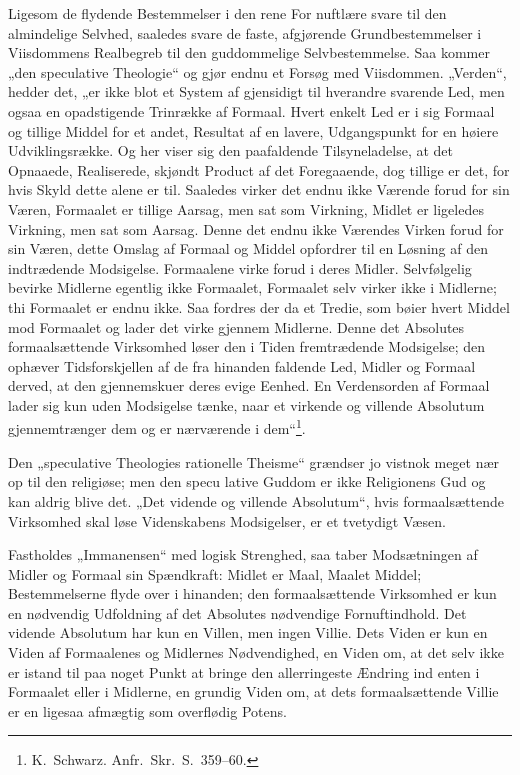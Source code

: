 \documentclass[12pt]{book}
\begin{document}
Ligesom de flydende Bestemmelser i den rene For\-
nuftlære svare til den almindelige Selvhed, saaledes svare de faste,
afgjørende Grundbestemmelser i Viisdommens Realbegreb til den
guddommelige Selvbestemmelse. Saa kommer „den speculative
Theologie“ og gjør endnu et Forsøg med Viisdommen. „Verden“, hedder
det, „er ikke blot et System af gjensidigt til hverandre svarende
Led, men ogsaa en opadstigende Trinrække af Formaal. Hvert enkelt
Led er i sig Formaal og tillige Middel for et andet, Resultat af en
lavere, Udgangspunkt for en høiere Udviklingsrække. Og her viser sig
den paafaldende Tilsyneladelse, at det Opnaaede, Realiserede,
skjøndt Product af det Foregaaende, dog tillige er det, for hvis
Skyld dette alene er til. Saaledes virker det endnu ikke Værende
forud for sin Væren, Formaalet er tillige Aarsag, men sat som
Virkning, Midlet er ligeledes Virkning, men sat som Aarsag. Denne
det endnu ikke Værendes Virken forud for sin Væren, dette Omslag af
Formaal og Middel opfordrer til en Løsning af den indtrædende
Modsigelse. Formaalene virke forud i deres Midler. Selvfølgelig
bevirke Midlerne egentlig ikke Formaalet, Formaalet selv virker ikke
i Midlerne; thi Formaalet er endnu ikke. Saa fordres der da et
Tredie, som bøier hvert Middel mod Formaalet og lader det virke
gjennem Midlerne. Denne det Absolutes formaalsættende Virksomhed
løser den i Tiden fremtrædende Modsigelse; den ophæver
Tidsforskjellen af de fra hinanden faldende Led, Midler og Formaal
derved, at den gjennemskuer deres evige Eenhed. En Verdensorden af
Formaal lader sig kun uden Modsigelse tænke, naar et virkende og
villende Absolutum gjennemtrænger dem og er nærværende i
dem“\footnote{K.\ Schwarz. Anfr.\ Skr.\ S.\ 359--60.}.

Den „speculative Theologies rationelle Theisme“ grændser jo vistnok
meget nær op til den religiøse; men den specu\-
lative Guddom er ikke Religionens Gud og kan aldrig blive det. „Det
vidende og villende Absolutum“, hvis formaalsættende Virksomhed skal
løse Videnskabens Modsigelser, er et tvetydigt Væsen.

Fastholdes „Immanensen“ med logisk Strenghed, saa taber
Modsætningen af Midler og Formaal sin Spændkraft: Midlet er Maal,
Maalet Middel; Bestemmelserne flyde over i hinanden; den
formaalsættende Virksomhed er kun en nødvendig Udfoldning af det
Absolutes nødvendige Fornuftindhold. Det vidende Absolutum har kun
en Villen, men ingen Villie. Dets Viden er kun en Viden af
Formaalenes og Midlernes Nødvendighed, en Viden om, at det selv ikke
er istand til paa noget Punkt at bringe den allerringeste Ændring
ind enten i Formaalet eller i Midlerne, en grundig Viden om, at dets
formaalsættende Villie er en ligesaa afmægtig som overflødig Potens.
\end{document}
